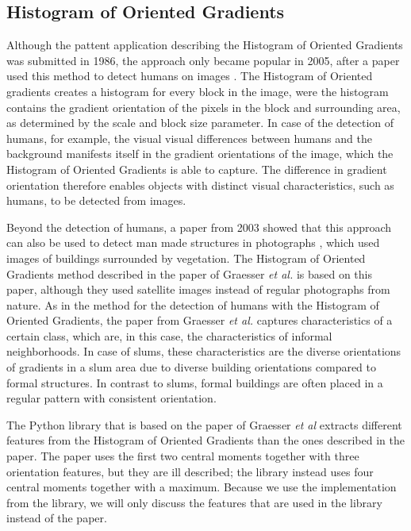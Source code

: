 \subsection{Histogram of Oriented Gradients}

Although the pattent application describing the Histogram of Oriented Gradients was submitted in 1986, the approach only became popular in 2005, after a paper used this method to detect humans on images \cite{dalal2005histograms}. The Histogram of Oriented gradients creates a histogram for every block in the image, were the histogram contains the gradient orientation of the pixels in the block and surrounding area, as determined by the scale and block size parameter. In case of the detection of humans, for example, the visual visual differences between humans and the background manifests itself in the gradient orientations of the image, which the Histogram of Oriented Gradients is able to capture. The difference in gradient orientation therefore enables objects with distinct visual characteristics, such as humans, to be detected from images.

Beyond the detection of humans, a paper from 2003 showed that this approach can also be used to detect man made structures in photographs \cite{kumar2003man}, which used images of buildings surrounded by vegetation. The Histogram of Oriented Gradients method described in the paper of Graesser \textit{et al.} is based on this paper, although they used satellite images instead of regular photographs from nature. As in the method for the detection of humans with the Histogram of Oriented Gradients, the paper from Graesser \textit{et al.} captures characteristics of a certain class, which are, in this case, the characteristics of informal neighborhoods. In case of slums, these characteristics are the diverse orientations of gradients in a slum area due to diverse building orientations compared to formal structures. In contrast to slums, formal buildings are often placed in a regular pattern with consistent orientation.


The Python library that is based on the paper of Graesser \textit{et al} extracts different features from the Histogram of Oriented Gradients than the ones described in the paper. The paper uses the first two central moments together with three orientation features, but they are ill described; the library instead uses four central moments together with a maximum. Because we use the implementation from the library, we will only discuss the features that are used in the library instead of the paper. 

